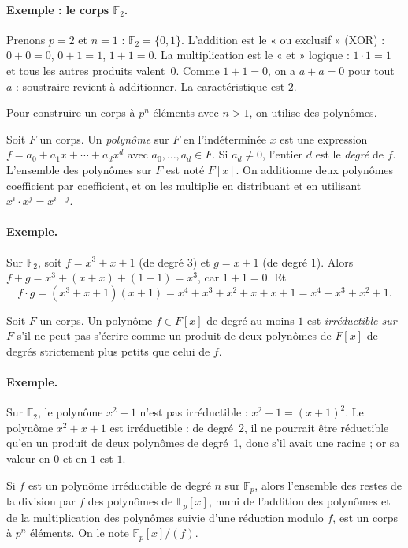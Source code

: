\paragraph{Exemple : le corps $\mathbb{F}_2$.} Prenons $p=2$ et $n=1$ : $\mathbb{F}_2=\{0,1\}$. L'addition est le « ou exclusif » (XOR) : $0+0=0$, $0+1=1$, $1+1=0$. La multiplication est le « et » logique : $1\cdot1=1$ et tous les autres produits valent~$0$. Comme $1+1=0$, on a $a+a=0$ pour tout $a$ : soustraire revient à additionner. La caractéristique est $2$.

\medskip
Pour construire un corps à $p^n$ éléments avec $n>1$, on utilise des polynômes.
\begin{definition}
Soit $F$ un corps. Un \emph{polynôme} sur $F$ en l'indéterminée $x$ est une expression $f=a_0+a_1x+\cdots+a_dx^d$ avec $a_0,\dots,a_d\in F$. Si $a_d\neq0$, l'entier $d$ est le \emph{degré} de $f$. L'ensemble des polynômes sur $F$ est noté $F[x]$. On additionne deux polynômes coefficient par coefficient, et on les multiplie en distribuant et en utilisant $x^i\cdot x^j=x^{i+j}$.
\end{definition}

\paragraph{Exemple.} Sur $\mathbb{F}_2$, soit $f=x^3+x+1$ (de degré $3$) et $g=x+1$ (de degré $1$). Alors $f+g=x^3+(x+x)+(1+1)=x^3$, car $1+1=0$. Et
\[f\cdot g=(x^3+x+1)(x+1)=x^4+x^3+x^2+x+x+1=x^4+x^3+x^2+1.\]

\begin{definition}
Soit $F$ un corps. Un polynôme $f\in F[x]$ de degré au moins $1$ est \emph{irréductible sur $F$} s'il ne peut pas s'écrire comme un produit de deux polynômes de $F[x]$ de degrés strictement plus petits que celui de $f$.
\end{definition}

\paragraph{Exemple.} Sur $\mathbb{F}_2$, le polynôme $x^2+1$ n'est pas irréductible : $x^2+1=(x+1)^2$. Le polynôme $x^2+x+1$ est irréductible : de degré~2, il ne pourrait être réductible qu'en un produit de deux polynômes de degré~1, donc s'il avait une racine ; or sa valeur en $0$ et en $1$ est $1$.

\begin{theorem}
Si $f$ est un polynôme irréductible de degré $n$ sur $\mathbb{F}_p$, alors l'ensemble des restes de la division par $f$ des polynômes de $\mathbb{F}_p[x]$, muni de l'addition des polynômes et de la multiplication des polynômes suivie d'une réduction modulo $f$, est un corps à $p^n$ éléments. On le note $\mathbb{F}_p[x]/(f)$.
\end{theorem}

